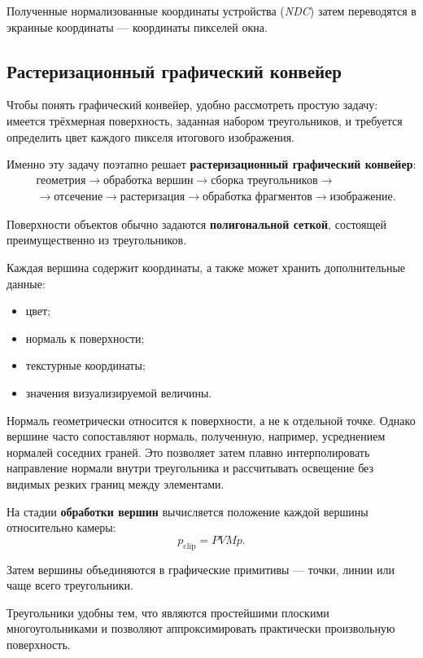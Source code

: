 Полученные нормализованные координаты устройства (\textit{NDC}) затем переводятся в экранные координаты --- координаты пикселей окна.

\subsection{Растеризационный графический конвейер}

Чтобы понять графический конвейер, удобно рассмотреть простую задачу: имеется трёхмерная поверхность, заданная набором треугольников, и требуется определить цвет каждого пикселя итогового изображения.

Именно эту задачу поэтапно решает \textbf{растеризационный графический конвейер}:
\[
\begin{split}
	&\text{геометрия}
	\rightarrow
	\text{обработка вершин}
	\rightarrow
	\text{сборка треугольников}
	\rightarrow\\
	&\rightarrow
	\text{отсечение}
	\rightarrow
	\text{растеризация}
	\rightarrow
	\text{обработка фрагментов}
	\rightarrow
	\text{изображение}.
\end{split}
\]

Поверхности объектов обычно задаются \textbf{полигональной сеткой}, состоящей преимущественно из треугольников.

Каждая вершина содержит координаты, а также может хранить дополнительные данные:
\begin{itemize}
	\item цвет;
	\item нормаль к поверхности;
	\item текстурные координаты;
	\item значения визуализируемой величины.
\end{itemize}

Нормаль геометрически относится к поверхности, а не к отдельной точке. Однако вершине часто сопоставляют нормаль, полученную, например, усреднением нормалей соседних граней. Это позволяет затем плавно интерполировать направление нормали внутри треугольника и рассчитывать освещение без видимых резких границ между элементами.

На стадии \textbf{обработки вершин} вычисляется положение каждой вершины относительно камеры:
\[
p_{\mathrm{clip}}=PVMp.
\]

Затем вершины объединяются в графические примитивы --- точки, линии или чаще всего треугольники.

Треугольники удобны тем, что являются простейшими плоскими многоугольниками и позволяют аппроксимировать практически произвольную поверхность.

